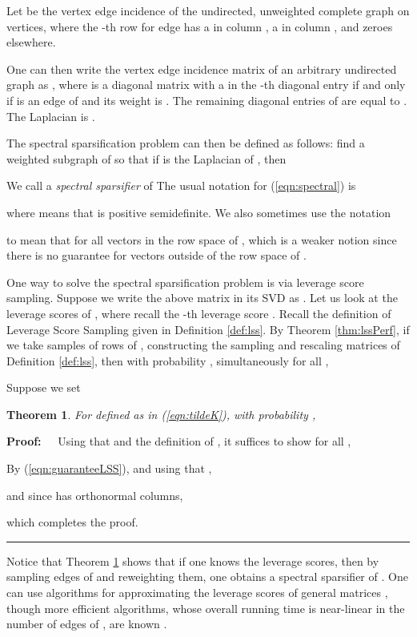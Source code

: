 \documentclass[11pt]{article}
\newtheorem{theorem}{Theorem}
\newenvironment{proof}{\begin{trivlist} \item {\bf Proof:~~}}
  {\qed\end{trivlist}}
\def\qed{\hfill\rule{2mm}{2mm}}
\begin{document}
Let  be the vertex edge incidence of the
undirected, unweighted complete graph on  vertices, where the -th row  for edge  has a  in column
, a  in column , and zeroes elsewhere. 

One can then write the vertex edge incidence matrix of an arbitrary undirected graph  as 
, where  is a diagonal matrix with a  in the -th
diagonal entry if and only if  is an edge of  and its weight is . 
The remaining diagonal entries of  are equal to . The
Laplacian is . 

The spectral sparsification problem can then be defined as follows: find a weighted subgraph  of  so that if 
 is the Laplacian of , then 

We call  a {\it spectral sparsifier} of  
The usual notation for (\ref{eqn:spectral}) is

where  means that  is positive semidefinite. We also sometimes use the notation
 
to mean that  for all vectors 
in the row space of , which is a weaker notion since there is no guarantee for vectors 
outside of the row space of . 

One way to solve the spectral sparsification problem is via leverage score sampling. Suppose
we write the above matrix  in its SVD as . Let us look at the leverage scores of ,
where recall the -th leverage score . Recall the definition of Leverage
Score Sampling given in Definition \ref{def:lss}. By Theorem \ref{thm:lssPerf}, if we take
 samples of rows of , constructing the sampling and rescaling matrices
of Definition \ref{def:lss}, then with probability , simultaneously for all ,

Suppose we set

\begin{theorem}\label{thm:lssSimple}
For  defined as in (\ref{eqn:tildeK}), with probability , 

\end{theorem}
\begin{proof}
Using that  and the definition of , it suffices to show for all , 

By (\ref{eqn:guaranteeLSS}), and using that , 

and since  has orthonormal columns,

which completes the proof. 
\end{proof}
Notice that Theorem \ref{thm:lssSimple} shows that if one knows the leverage scores, then
by sampling  edges of  and reweighting them, one obtains a spectral
sparsifier of . One can use algorithms for approximating the leverage scores of general matrices \cite{DMMW12},
though more efficient algorithms, whose overall running time is near-linear in the number of edges
of , are known \cite{SS08,st11}. 
\end{document}
